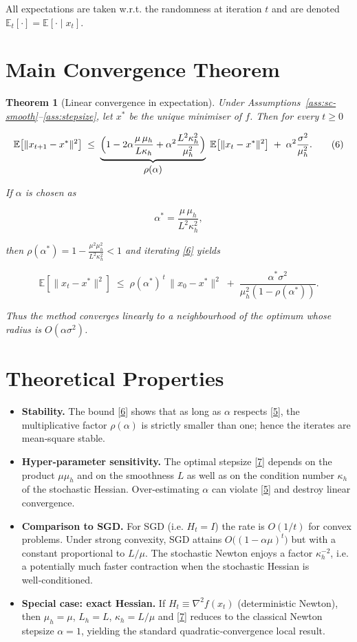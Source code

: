 \documentclass{article}
\newcommand{\E}{\mathbb{E}}
\newtheorem{theorem}{Theorem}
\begin{document}
All expectations are taken w.r.t. the randomness at iteration $t$ and are denoted $\E_t[\cdot]=\E[\cdot\mid x_t]$.

\section*{Main Convergence Theorem}
\begin{theorem}[Linear convergence in expectation]\label{thm:linear}
Under Assumptions~\ref{ass:sc-smooth}–\ref{ass:stepsize}, let $x^{*}$ be the unique minimiser of $f$. Then for every $t\ge0$

\[
\E\!\left[\|x_{t+1}-x^{*}\|^{2}\right]
\;\le\;
\underbrace{\Bigl(1-2\alpha\frac{\mu\,\mu_{h}}{L\kappa_{h}}+\alpha^{2}\frac{L^{2}\kappa_{h}^{2}}{\mu_{h}^{2}}\Bigr)}_{\displaystyle\rho(\alpha)}\;
\E\!\left[\|x_{t}-x^{*}\|^{2}\right]
\;+\;
\alpha^{2}\frac{\sigma^{2}}{\mu_{h}^{2}} .
\tag{6}
\]

If $\alpha$ is chosen as  

\[
\alpha^{*}= \frac{\mu\,\mu_{h}}{L^{2}\kappa_{h}^{2}},
\tag{7}
\]

then $\rho(\alpha^{*})=1-\frac{\mu^{2}\mu_{h}^{2}}{L^{2}\kappa_{h}^{2}}<1$ and iterating \eqref{6} yields  

\[
\E\!\left[\|x_{t}-x^{*}\|^{2}\right]
\;\le\;
\rho(\alpha^{*})^{\,t}\,\|x_{0}-x^{*}\|^{2}
\;+\;
\frac{\alpha^{*}\sigma^{2}}{\mu_{h}^{2}(1-\rho(\alpha^{*}))}.
\tag{8}
\]

Thus the method converges linearly to a neighbourhood of the optimum whose radius is $O(\alpha\sigma^{2})$.
\end{theorem}

\section*{Theoretical Properties}
\begin{itemize}[leftmargin=*]
\item \textbf{Stability.} The bound \eqref{6} shows that as long as $\alpha$ respects \eqref{5}, the multiplicative factor $\rho(\alpha)$ is strictly smaller than one; hence the iterates are mean‑square stable.
\item \textbf{Hyper‑parameter sensitivity.} The optimal stepsize \eqref{7} depends on the product $\mu\mu_{h}$ and on the smoothness $L$ as well as on the condition number $\kappa_{h}$ of the stochastic Hessian. Over‑estimating $\alpha$ can violate \eqref{5} and destroy linear convergence.
\item \textbf{Comparison to SGD.} For SGD (i.e. $H_t=I$) the rate is $O(1/t)$ for convex problems. Under strong convexity, SGD attains $O\bigl((1-\alpha\mu)^{t}\bigr)$ but with a constant proportional to $L/\mu$. The stochastic Newton enjoys a factor $\kappa_{h}^{-2}$, i.e. a potentially much faster contraction when the stochastic Hessian is well‑conditioned.
\item \textbf{Special case: exact Hessian.} If $H_t\equiv\nabla^{2}f(x_t)$ (deterministic Newton), then $\mu_{h}=\mu$, $L_{h}=L$, $\kappa_{h}=L/\mu$ and \eqref{7} reduces to the classical Newton stepsize $\alpha=1$, yielding the standard quadratic‑convergence local result.
\end{itemize}
\end{document}
